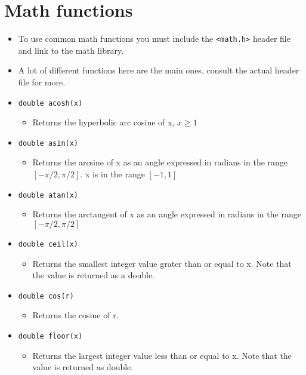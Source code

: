 \section{Math functions}
\begin{itemize}
    \item To use common math functions you must include the \verb|<math.h>| header file and link to the math library.
    \item A lot of different functions here are the main ones, consult the actual header file for more.
    \item \texttt{double acosh(x)}
        \begin{itemize}
            \item Returns the hyperbolic arc cosine of x, $x \geq 1$ 
        \end{itemize}
    
    \item \texttt{double asin(x)}
        \begin{itemize}
            \item Returns the arcsine of x as an angle expressed in radians in the range $[-\pi/2,\pi/2]$. x is in the range $[-1,1]$
        \end{itemize}
    
    \item \texttt{double atan(x)}
        \begin{itemize}
            \item Returns the arctangent of x as an angle expressed in radians in the range $[-\pi/2,\pi/2]$
        \end{itemize}
    
    \item \texttt{double ceil(x)}
        \begin{itemize}
            \item Returns the smallest integer value grater than or equal to x. Note that the value is returned as a double.
        \end{itemize}
    
    \item \texttt{double cos(r)}
        \begin{itemize}
            \item Returns the cosine of r.
        \end{itemize}

    \item \texttt{double floor(x)}
        \begin{itemize}
            \item Returns the largest integer value less than or equal to x. Note that the value is returned as double.
        \end{itemize}
    

\end{itemize}
